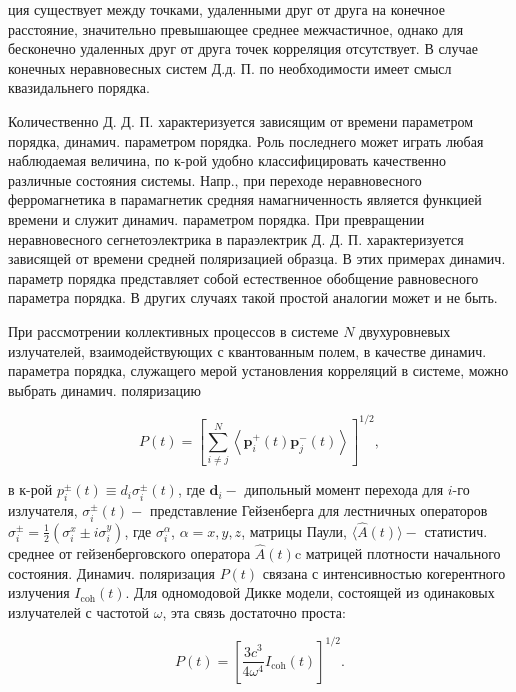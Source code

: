 \documentclass[10pt]{article}
\begin{document}
ция существует между точками, удаленными друг от друга на конечное расстояние, значительно превышающее среднее межчастичное, однако для бесконечно удаленных друг от друга точек корреляция отсутствует. В случае конечных неравновесных систем Д.д. П. по необходимости имеет смысл квазидальнего порядка.



Количественно Д. Д. П. характеризуется зависящим от времени параметром порядка, динамич. параметром порядка. Роль последнего может играть любая наблюдаемая величина, по к-рой удобно классифицировать качественно различные состояния системы. Напр., при переходе неравновесного ферромагнетика в парамагнетик средняя намагниченность является функцией времени и служит динамич. параметром порядка. При превращении неравновесного сегнетоэлектрика в параэлектрик Д. Д. П. характеризуется зависящей от времени средней поляризацией образца. В этих примерах динамич. параметр порядка представляет собой естественное обобщение равновесного параметра порядка. В других случаях такой простой аналогии может и не быть.



При рассмотрении коллективных процессов в системе $N$ двухуровневых излучателей, взаимодействующих с квантованным полем, в качестве динамич. параметра порядка, служащего мерой установления корреляций в системе, можно выбрать динамич. поляризацию



\[

P(t)=\left[\sum_{i \neq j}^{N}\left\langle\boldsymbol{p}_{i}^{+}(t) \boldsymbol{p}_{j}^{-}(t)\right\rangle\right]^{1 / 2},

\]



в к-рой $p_{i}^{ \pm}(t) \equiv d_{i} \sigma_{i}^{ \pm}(t)$, где $\boldsymbol{d}_{i}-$ дипольный момент перехода для $i$-го излучателя, $\sigma_{i}^{ \pm}(t)-$ представление Гейзенберга для лестничных операторов $\sigma_{i}^{ \pm}=\frac{1}{2}\left(\sigma_{i}^{x} \pm i \sigma_{i}^{y}\right)$, где $\sigma_{i}^{\alpha}$, $\alpha=x, y, z$, матрицы Паули, $\langle\hat{A}(t)\rangle-$ статистич. среднее от гейзенберговского оператора $\hat{A}(t) \mathrm{c}$ матрицей плотности начального состояния. Динамич. поляризация $P(t)$ связана с интенсивностью когерентного излучения $I_{\mathrm{coh}}(t)$. Для одномодовой Дикке модели, состоящей из одинаковых излучателей с частотой $\omega$, эта связь достаточно проста:



\[

P(t)=\left[\frac{3 c^{3}}{4 \omega^{4}} I_{\operatorname{coh}}(t)\right]^{1 / 2} .

\]
\end{document}
